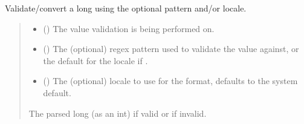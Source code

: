 \documentclass[letterpaper,10pt,english]{sphinxmanual}
\begin{document}
\begin{fulllineitems}
\begin{fulllineitems}
\begin{quote}
\begin{description}
\end{description}\end{quote}

\end{fulllineitems}


\begin{fulllineitems}
\label{\detokenize{apache_commons_validator_python.routines:apache_commons_validator_python.routines.long_validator.LongValidator.validate}}
\pysigstartsignatures
{}
\pysigstopsignatures
\sphinxAtStartPar
Validate/convert a long using the optional pattern and/or locale.
\begin{quote}\begin{description}
\begin{itemize}
\item {} 
\sphinxAtStartPar
{} () \textendash{} The value validation is being performed on.

\item {} 
\sphinxAtStartPar
{} () \textendash{} The (optional) regex pattern used to validate the value against,
or the default for the locale if .

\item {} 
\sphinxAtStartPar
{} () \textendash{} The (optional) locale to use for the format, defaults to the system default.

\end{itemize}

\sphinxAtStartPar
The parsed long (as an int) if valid or  if invalid.

\end{description}\end{quote}

\end{fulllineitems}


\end{fulllineitems}
\end{document}
